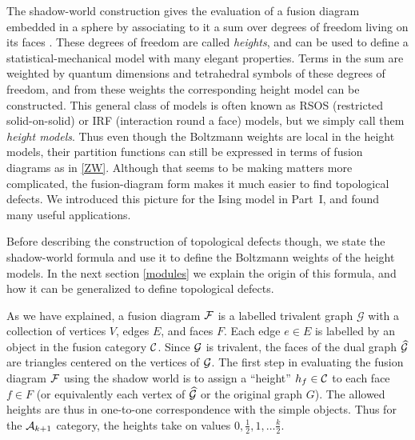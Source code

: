 The shadow-world construction gives the evaluation of a fusion diagram embedded in a sphere  by associating to it a sum over degrees of freedom living on its faces \cite{Reshetikhin1988,TuraevViro1992,Barrett1996}. These degrees of freedom are called {\em heights}, and can be used to define a statistical-mechanical model with many elegant properties. Terms in the sum are weighted by quantum dimensions and tetrahedral symbols of these degrees of freedom, and from these weights the corresponding height model can be constructed. 
This general class of models is often known as RSOS (restricted solid-on-solid) or IRF (interaction round a face) models, but we simply call them {\em height models}. Thus even though the Boltzmann weights are local in the height models, their partition functions can still be expressed in terms of fusion diagrams as in \eqref{ZW}. Although that seems to be making matters more complicated, the fusion-diagram form makes it much easier to find topological defects. We introduced this picture for the Ising model in Part~I, and found many useful applications. 



Before describing the construction of topological defects though, we state the shadow-world formula and use it to define the Boltzmann weights of the height models. In the next section \ref{modules} we explain the origin of this formula, and how it can be generalized to define topological defects.  

As we have explained, a fusion diagram ${\cal F}$ is a labelled trivalent graph $\mathcal{G}$ with a collection of vertices $V$, edges $E$, and faces $F$. Each edge $e \in E$ is labelled by an object in the fusion category ${\cal C}$.
Since ${\cal G}$ is trivalent, the faces of the dual graph $\widehat{\cal G}$ are triangles centered on the vertices of $\cal{G}$. The first step in evaluating the fusion diagram ${\cal F}$ using the shadow world is to assign a ``height'' $h_f \in {\cal C}$ to each face $f \in F$ (or equivalently each vertex of $\widehat{\cal G}$ or the original graph $G$).  The allowed heights are thus in one-to-one correspondence with the simple objects. Thus for the ${\cal A}_{k+1}$ category, the heights take on values $0,\tfrac12,1,\dots \tfrac{k}{2}$. 


